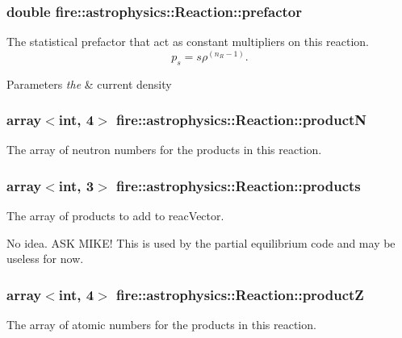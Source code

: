 \subsubsection[{\texorpdfstring{prefactor}{prefactor}}]{\setlength{\rightskip}{0pt plus 5cm}double fire\+::astrophysics\+::\+Reaction\+::prefactor}\hypertarget{a00242_a5033228e6305beb4e8dd717d2f088d99}{}\label{a00242_a5033228e6305beb4e8dd717d2f088d99}
The statistical prefactor that act as constant multipliers on this reaction. \[ p_s = s\rho^{(n_R -1)}. \] 
\begin{DoxyParams}{Parameters}
{\em the} & current density \\
\hline
\end{DoxyParams}
\subsubsection[{\texorpdfstring{productN}{productN}}]{\setlength{\rightskip}{0pt plus 5cm}array$<$int, 4$>$ fire\+::astrophysics\+::\+Reaction\+::productN}\hypertarget{a00242_a81251169f8dd972b6cdc285fbc42c331}{}\label{a00242_a81251169f8dd972b6cdc285fbc42c331}
The array of neutron numbers for the products in this reaction. 
\subsubsection[{\texorpdfstring{products}{products}}]{\setlength{\rightskip}{0pt plus 5cm}array$<$int, 3$>$ fire\+::astrophysics\+::\+Reaction\+::products}\hypertarget{a00242_a5d0e77ebec059081aaafa5ba86df4c88}{}\label{a00242_a5d0e77ebec059081aaafa5ba86df4c88}
The array of products to add to reac\+Vector.

No idea. A\+SK M\+I\+K\+E! This is used by the partial equilibrium code and may be useless for now. 
\subsubsection[{\texorpdfstring{productZ}{productZ}}]{\setlength{\rightskip}{0pt plus 5cm}array$<$int, 4$>$ fire\+::astrophysics\+::\+Reaction\+::productZ}\hypertarget{a00242_a0586d888e1f60d6371239af888f9158b}{}\label{a00242_a0586d888e1f60d6371239af888f9158b}
The array of atomic numbers for the products in this reaction. 
